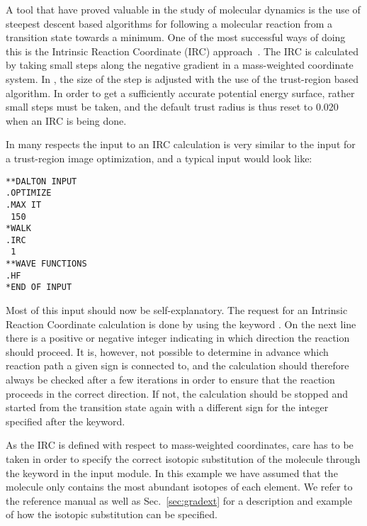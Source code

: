 A tool that have proved valuable in the study of molecular
dynamics 
is the use of steepest descent based algorithms
for following a molecular reaction from a transition
state towards a minimum. One of the
most successful ways of doing this is the Intrinsic Reaction Coordinate (IRC)
approach~\cite{kfacr14,pmjcp88}. The IRC is calculated by taking small steps along the 
negative gradient in a mass-weighted coordinate system. In \siraba , the 
size of the step is adjusted with the use of the trust-region based
algorithm. In order to get a sufficiently accurate potential energy surface,
rather small steps must be taken, and the default trust radius is thus reset
to 0.020 when an IRC is being done.

In many respects the input to an IRC calculation is very similar to
the input for a trust-region image optimization,
and a typical input would look like:

\begin{verbatim}
**DALTON INPUT
.OPTIMIZE
.MAX IT
 150
*WALK
.IRC
 1
**WAVE FUNCTIONS
.HF
*END OF INPUT
\end{verbatim}

Most of this input should now be self-explanatory. The request for an
Intrinsic Reaction Coordinate calculation is done by using the keyword
. On the next line there is a positive or negative integer
indicating in which direction the reaction should proceed. It is,
however, not possible to determine in advance which reaction path a
given sign is connected to, and the calculation should therefore
always be checked after a few iterations in order to ensure that the
reaction proceeds in the correct direction. If not, the calculation
should be stopped and started from the transition state again with a
different sign for the integer specified after the  keyword.

As the IRC is defined with respect to mass-weighted
coordinates, care
has to be taken in order to specify the correct isotopic substitution
of the molecule through the keyword  in the
 input module. In this example we have assumed that the
molecule only contains the most abundant isotopes of each element. We
refer to the reference manual as well as Sec.~\ref{sec:gradext} for a
description and example of how the isotopic substitution can be specified.

